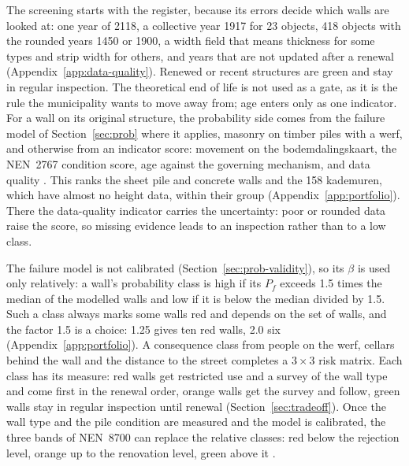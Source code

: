 The screening starts with the register, because its errors decide which walls
are looked at: one year of 2118, a collective year 1917 for 23 objects, 418
objects with the rounded years 1450 or 1900, a width field that means
thickness for some types and strip width for others, and years that are not
updated after a renewal (Appendix~\ref{app:data-quality}). Renewed or recent
structures are green and stay in regular inspection. The theoretical end of
life is not used as a gate, as it is the rule the municipality wants to move
away from; age enters only as one indicator. For a wall on its original
structure, the probability side comes from the failure model of
Section~\ref{sec:prob} where it applies, masonry on timber piles with a werf,
and otherwise from an indicator score: movement on the bodemdalingskaart, the
NEN~2767 condition score, age against the governing mechanism, and data quality
\parencite{bodemdalingskaart,nen2767}. This ranks the sheet pile and concrete
walls and the 158 kademuren, which have almost no height data, within their
group (Appendix~\ref{app:portfolio}). There the data-quality indicator carries
the uncertainty: poor or rounded data raise the score, so missing evidence
leads to an inspection rather than to a low class.

The failure model is not calibrated (Section~\ref{sec:prob-validity}), so its
$\beta$ is used only relatively: a wall's probability class is high if its
$P_f$ exceeds 1.5 times the median of the modelled walls and low if it is below
the median divided by 1.5. Such a class always marks some walls red and
depends on the set of walls, and the factor 1.5 is a choice: 1.25 gives ten red
walls, 2.0 six (Appendix~\ref{app:portfolio}). A consequence class from people on the werf, cellars
behind the wall and the distance to the street completes a $3\times3$ risk
matrix. Each class has its measure: red walls get restricted use and a survey
of the wall type and come first in the renewal order, orange walls get the
survey and follow, green walls stay in regular inspection until renewal
(Section~\ref{sec:tradeoff}). Once the wall type and the pile condition are
measured and the model is calibrated, the three bands
of NEN~8700 can replace the relative classes: red below the rejection level,
orange up to the renovation level, green above it \parencite{nen8700}.

